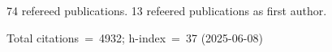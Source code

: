74 refereed publications. 13 refeered publications as first author.

Total citations~=~4932; h-index~=~37 (2025-06-08)